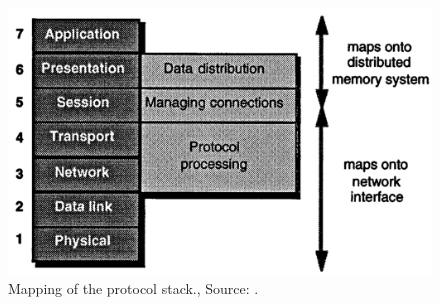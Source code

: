 \begin{figure}
	\centering
	\includegraphics[width=0.95\linewidth]{Figures/Rep4OSI.png}
	\caption{Mapping of the protocol stack., Source: \cite{steenkiste1997high}.} 
    \label{fig:rep4:osi}
\end{figure}